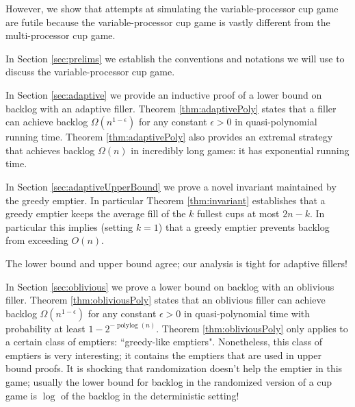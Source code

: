 \documentclass[twocolumn]{article}[10pt]
\renewcommand{\paragraph}[1]{\vspace{0.09in}\noindent{\bf \boldmath #1.}}
\DeclareMathOperator{\polylog}{\text{polylog}}
\begin{document}
However, we show that attempts at simulating the variable-processor cup
game are futile because the variable-processor cup game
is vastly different from the multi-processor cup game. 

\paragraph{Outline and Results}
In Section \ref{sec:prelims} we establish the conventions and notations we will
use to discuss the variable-processor cup game. 

In Section \ref{sec:adaptive} we provide an inductive
proof of a lower bound on backlog with an adaptive filler. Theorem 
\ref{thm:adaptivePoly} states that a filler can achieve backlog
$\Omega(n^{1-\epsilon})$ for any constant $\epsilon > 0$ in quasi-polynomial
running time. Theorem \ref{thm:adaptivePoly} also provides an extremal strategy
that achieves backlog $\Omega(n)$ in incredibly long games: it has exponential
running time.

In Section \ref{sec:adaptiveUpperBound} we prove a novel invariant maintained
by the greedy emptier. In particular Theorem \ref{thm:invariant} establishes
that a greedy emptier keeps the average fill of the $k$ fullest cups at most
$2n-k$. In particular this implies (setting $k=1$) that a greedy emptier
prevents backlog from exceeding $O(n)$. 

The lower bound and upper bound agree; our analysis is tight for adaptive fillers!

In Section \ref{sec:oblivious} we prove a lower bound on backlog with an oblivious filler. 
Theorem \ref{thm:obliviousPoly} states that an oblivious filler can achieve
backlog $\Omega(n^{1-\epsilon})$ for any constant $\epsilon > 0$ in
quasi-polynomial time with probability at least $1-2^{-\polylog(n)}$.
Theorem \ref{thm:obliviousPoly} only applies to a certain class of emptiers:
``greedy-like emptiers". Nonetheless, this class of emptiers is very
interesting; it contains the emptiers that are used in upper bound proofs.
It is shocking that randomization doesn't help the emptier in this game;
usually the lower bound for backlog in the randomized version of a cup game is
$\log$ of the backlog in the deterministic setting!
\end{document}
